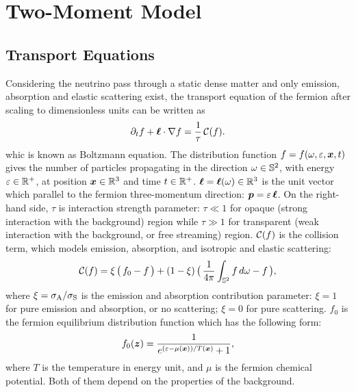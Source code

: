 \section{Two-Moment Model}\label{se:Two-MomentModel}

\subsection{Transport Equations}
Considering the neutrino pass through a static dense matter and only emission, absorption and elastic scattering exist, the transport equation of the fermion after scaling to dimensionless units can be written as
\begin{equation}
  \pd{f}{t}+\vect{\ell}\cdot\nabla f
  =\f{1}{\tau}\,\cC(f).
  \label{eq:boltzmann}
\end{equation}
whic is known as Boltzmann equation.
The distribution function $f = f(\omega,\varepsilon,\boldsymbol{x},t)$ gives the number of particles propagating in the direction $\omega\in\mathbb{S}^{2}$, with energy $\varepsilon\in\mathbb{R}^{+}$, at position $\boldsymbol{x}\in\mathbb{R}^{3}$ and time $t\in\mathbb{R}^{+}$.  
$\boldsymbol{\ell} = \boldsymbol{\ell}(\omega)\in\mathbb{R}^{3}$ is the unit vector which parallel to the fermion three-momentum direction: $\boldsymbol{p}=\varepsilon\,\boldsymbol{\ell}$.
On the right-hand side, $\tau$ is interaction strength parameter: $\tau\ll1$ for opaque (strong interaction with the background) region while $\tau\gg1$ for transparent (weak interaction with the background, or free streaming) region.
$\mathcal{C}(f)$ is the collision term, which models emission, absorption, and isotropic and elastic scattering: 
\begin{equation}
  \cC(f)=\xi\,\big(\,f_{0}-f\,\big)
  +(1-\xi)\,\big(\,\f{1}{4\pi}\int_{\bbS^{2}}f\,d\omega-f\,\big),
  \label{eq:collisionTerm}
\end{equation}
where $\xi = \sigma_{{\rm A}} / \sigma_{{\rm S}} $ is the emission and absorption contribution parameter: $\xi = 1$ for pure emission and absorption, or no scattering; $\xi = 0$ for pure scattering. 
$f_{0}$ is the fermion equilibrium distribution function which has the following form:
\begin{equation}
  f_{0}(\vect{z})=\f{1}{e^{(\varepsilon-\mu(\vect{x}))/T(\vect{x})}+1},  
  \label{eq:fermiDirac}
\end{equation}
where $T$ is the temperature in energy unit, and $\mu$ is the fermion chemical potential.
Both of them depend on the properties of the background.

